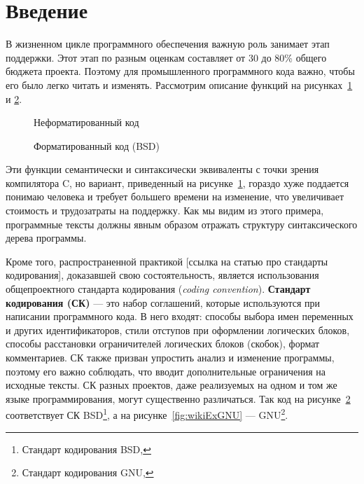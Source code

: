 \section*{Введение}

В жизненном цикле программного обеспечения важную роль занимает этап
поддержки\cite{maintance}. Этот этап по разным оценкам
составляет от 30 до 80\% общего бюджета проекта. Поэтому для
промышленного программного кода важно, чтобы его было легко читать и изменять.
Рассмотрим описание функций
на рисунках~\ref{fig:wikiExUnfor} и \ref{fig:wikiExBSD}.

\begin{figure}[h!]
	\centering
	
	\caption{Неформатированный код}
	\label{fig:wikiExUnfor}
\end{figure}

\begin{figure}[h!]
	\centering
	
  \caption{Форматированный код (BSD)}
	\label{fig:wikiExBSD}
\end{figure}

Эти функции семантически и синтаксически эквиваленты с точки зрения
компилятора C, но вариант, приведенный на
рисунке~\ref{fig:wikiExUnfor}, гораздо хуже
поддается понимаю человека и требует большего времени на изменение,
что увеличивает стоимость и трудозатраты на поддержку. Как мы видим из этого
примера, программные тексты должны явным образом отражать
структуру синтаксического дерева программы.

Кроме того, распространенной практикой [ссылка на статью про стандарты
кодирования], доказавшей свою состоятельность, является использования
общепроектного стандарта кодирования (\textit{coding convention}).
\textbf{Стандарт кодирования (СК)} ---
это набор соглашений, которые используются
при написании программного кода. В него входят: способы выбора имен переменных
и других идентификаторов, стили отступов при оформлении логических блоков,
способы расстановки ограничителей логических блоков (скобок),
формат комментариев. СК также призван упростить анализ и изменение
программы, поэтому его важно соблюдать, что вводит
дополнительные ограничения на исходные тексты. СК разных проектов, даже
реализуемых на одном и том же языке программирования, могут существенно
различаться.
Так код на рисунке~\ref{fig:wikiExBSD} соответствует СК BSD\footnote{
Стандарт кодирования BSD, },
а на рисунке~\ref{fig:wikiExGNU} --- GNU\footnote{
Стандарт кодирования GNU, }.

